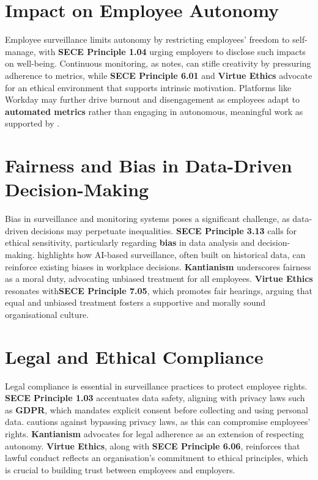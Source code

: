 \documentclass[a4paper, 11pt]{article}
\begin{document}
\section*{Impact on Employee Autonomy}
Employee surveillance limits autonomy by restricting employees' freedom to self-manage, with \textbf{SECE Principle 1.04} urging employers to disclose such impacts on well-being. Continuous monitoring, as \citet{Sewell2012} notes, can stifle creativity by pressuring adherence to metrics, while \textbf{SECE Principle 6.01} and \textbf{Virtue Ethics} advocate for an ethical environment that supports intrinsic motivation. Platforms like Workday may further drive burnout and disengagement as employees adapt to \textbf{automated metrics} rather than engaging in autonomous, meaningful work as supported by \citep{Gerten2019}.

\section*{Fairness and Bias in Data-Driven Decision-Making}
Bias in surveillance and monitoring systems poses a significant challenge, as data-driven decisions may perpetuate inequalities. \textbf{SECE Principle 3.13} calls for ethical sensitivity, particularly regarding \textbf{bias} in data analysis and decision-making. \citet{Zuboff2019} highlights how AI-based surveillance, often built on historical data, can reinforce existing biases in workplace decisions. \textbf{Kantianism} underscores fairness as a moral duty, advocating unbiased treatment for all employees. \textbf{Virtue Ethics} resonates with\textbf{SECE Principle 7.05}, which promotes fair hearings, arguing that equal and unbiased treatment fosters a supportive and morally sound organisational culture.

\section*{Legal and Ethical Compliance}
Legal compliance is essential in surveillance practices to protect employee rights. \textbf{SECE Principle 1.03} accentuates data safety, aligning with privacy laws such as \textbf{GDPR}, which mandates explicit consent before collecting and using personal data. \citet{Zuboff2019} cautions against bypassing privacy laws, as this can compromise employees’ rights. \textbf{Kantianism} advocates for legal adherence as an extension of respecting autonomy. \textbf{Virtue Ethics}, along with \textbf{SECE Principle 6.06}, reinforces that lawful conduct reflects an organisation’s commitment to ethical principles, which is crucial to building trust between employees and employers.
\end{document}
